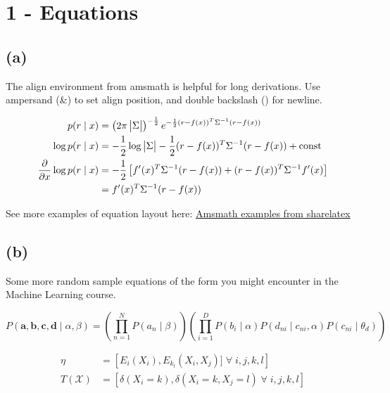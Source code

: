 \section*{1 - Equations}

\subsection*{(a)}

The align environment from amsmath is helpful for long derivations. Use ampersand (\&) to set align position, and double backslash (\text{\textbackslash\textbackslash}) for newline.

\begin{align*}
    p(r \mid x) &= \left( 2 \pi \begin{vmatrix}\Sigma\end{vmatrix} \right)^{-\frac{1}{2}} e^{-\frac{1}{2} (r - f(x))^T \Sigma^{-1}(r - f(x))} \\
    \log p(r \mid x) &= 
    -\frac{1}{2} \log{ \begin{vmatrix}\Sigma\end{vmatrix}}  -\frac{1}{2}(r - f(x))^T \Sigma^{-1}(r - f(x)) + \text{const} \\
    \pdv{}{x} \log p(r \mid x) &= -\frac{1}{2} \left[
    f'(x)^T\Sigma^{-1}(r-f(x)) + (r-f(x)) ^T\Sigma^{-1}f'(x) 
    \right] \\
    &= f'(x)^T\Sigma^{-1}(r-f(x)) 
\end{align*}

See more examples of equation layout here:
\href{https://www.sharelatex.com/project/59abf0c008b5663038fdbb07}{Amsmath examples from sharelatex}


\subsection*{(b)}
Some more random sample equations of the form you might encounter in the Machine Learning course. 

\begin{equation*}
    P(\bm{a}, \bm{b}, \bm{c}, \bm{d} \mid \alpha, \beta) =
     \left (
    \prod_{n=1}^N P(a_n \mid \beta)
     \right )
     \left (
    \prod_{i=1}^D P(b_i \mid \alpha)
    P(d_{ni} \mid c_{ni}, \alpha)
    P(c_{ni} \mid \theta_d)
     \right )
\end{equation*}

\begin{align}
    \eta &= \left[
    E_i(X_i), E_{k_l}(X_i, X_j)] \; \forall \; i, j, k, l
    \right ]
    \\
    T(\mathcal{X}) &= 
    \left [
    \delta(X_i = k), \delta(X_i = k, X_j = l) \; \forall \; i, j, k, l
    \right ]
\end{align}

